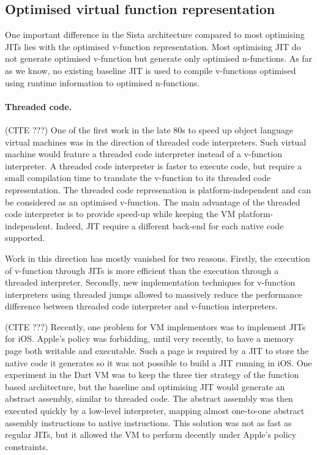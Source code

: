 \documentclass[a4paper,12pt,twoside]{../includes/ThesisStyle}
\begin{document}
\subsection{Optimised virtual function representation}
\label{sec:interface}

One important difference in the Sista architecture compared to most optimising JITs lies with the optimised v-function representation. Most optimising JIT do not generate optimised v-function but generate only optimised n-functions. As far as we know, no existing baseline JIT is used to compile v-functions optimised using runtime information to optimised n-functions.

\paragraph{Threaded code.}
(CITE ???)
One of the first work in the late 80s to speed up object language virtual machines was in the direction of threaded code interpreters. Such virtual machine would feature a threaded code interpreter instead of a v-function interpreter. A threaded code interpreter is faster to execute code, but require a small compilation time to translate the v-function to its threaded code representation. The threaded code represenation is platform-independent and can be considered as an optimised v-function. The main advantage of the threaded code interpreter is to provide speed-up while keeping the VM platform-independent. Indeed, JIT require a different back-end for each native code supported. 

Work in this direction has mostly vanished for two reasons. Firstly, the execution of v-function through JITs is more efficient than the execution through a threaded interpreter. Secondly, new implementation techniques for v-function interpreters using threaded jumps allowed to massively reduce the performance difference between threaded code interpreter and v-function interpreters.

(CITE ???)
Recently, one problem for VM implementors was to implement JITs for iOS. Apple's policy was forbidding, until very recently, to have a memory page both writable and executable. Such a page is required by a JIT to store the native code it generates so it was not possible to build a JIT running in iOS. One experiment in the Dart VM was to keep the three tier strategy of the function based architecture, but the baseline and optimising JIT would generate an abstract assembly, similar to threaded code. The abstract assembly was then executed quickly by a low-level interpreter, mapping almost one-to-one abstract assembly instructions to native instructions. This solution was not as fast as regular JITs, but it allowed the VM to perform decently under Apple's policy constraints.
\end{document}
